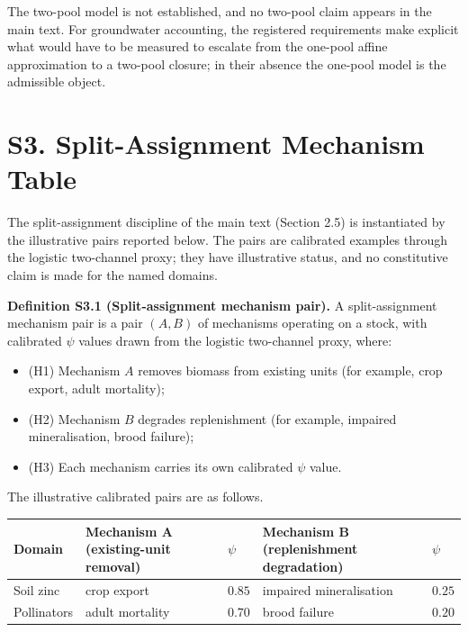 \documentclass[11pt]{article}
\begin{document}
The two-pool model is not established, and no two-pool claim appears in the main text. For groundwater accounting, the registered requirements make explicit what would have to be measured to escalate from the one-pool affine approximation to a two-pool closure; in their absence the one-pool model is the admissible object.

\vspace{0.8em}

\section*{S3. Split-Assignment Mechanism Table}\label{s3-split-assignment-mechanism-table}

The split-assignment discipline of the main text (Section 2.5) is instantiated by the illustrative pairs reported below. The pairs are calibrated examples through the logistic two-channel proxy; they have illustrative status, and no constitutive claim is made for the named domains.

\textbf{Definition S3.1 (Split-assignment mechanism pair).} A split-assignment mechanism pair is a pair \((A, B)\) of mechanisms operating on a stock, with calibrated \(\psi\) values drawn from the logistic two-channel proxy, where:

\begin{itemize}\setlength{\itemsep}{2pt}
\item (H1) Mechanism \(A\) removes biomass from existing units (for example, crop export, adult mortality);
\item (H2) Mechanism \(B\) degrades replenishment (for example, impaired mineralisation, brood failure);
\item (H3) Each mechanism carries its own calibrated \(\psi\) value.
\end{itemize}

The illustrative calibrated pairs are as follows.

\begin{longtable}{@{}l|l|l|l|l@{}}
\toprule
Domain & Mechanism A (existing-unit removal) & \(\psi\) & Mechanism B (replenishment degradation) & \(\psi\) \\
\midrule
Soil zinc & crop export & \(0.85\) & impaired mineralisation & \(0.25\) \\
Pollinators & adult mortality & \(0.70\) & brood failure & \(0.20\) \\
\bottomrule
\end{longtable}
\end{document}
